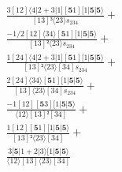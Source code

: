 \documentclass[varwidth, border=5pt]{standalone}
\begin{document}
\begin{my}
$\begin{gathered}
\scriptscriptstyle\frac{3[12]⟨4|2+3|1][𝟓1][1|𝟓|𝟓⟩}{[13]³⟨23⟩s_{234}} +\\
\scriptscriptstyle\frac{-1/2[12]⟨34⟩[𝟓1][1|𝟓|𝟓⟩}{[13]²⟨23⟩s_{234}} +\\
\scriptscriptstyle\frac{1[24]⟨4|2+3|1][𝟓1][1|𝟓|𝟓⟩}{[13]²⟨23⟩[34]s_{234}} +\\
\scriptscriptstyle\frac{2[24]⟨34⟩[𝟓1][1|𝟓|𝟓⟩}{[13]⟨23⟩[34]s_{234}} +\\
\scriptscriptstyle\frac{-1[12][𝟓3][1|𝟓|𝟓⟩}{⟨12⟩[13]²[34]} +\\
\scriptscriptstyle\frac{1[12][𝟓1][1|𝟓|𝟓⟩}{[13]²⟨23⟩[34]} +\\
\scriptscriptstyle\frac{3[𝟓|1+2|3⟩[1|𝟓|𝟓⟩}{⟨12⟩[13]⟨23⟩[34]} \phantom{+}
\end{gathered}$
\end{my}
\end{document}
